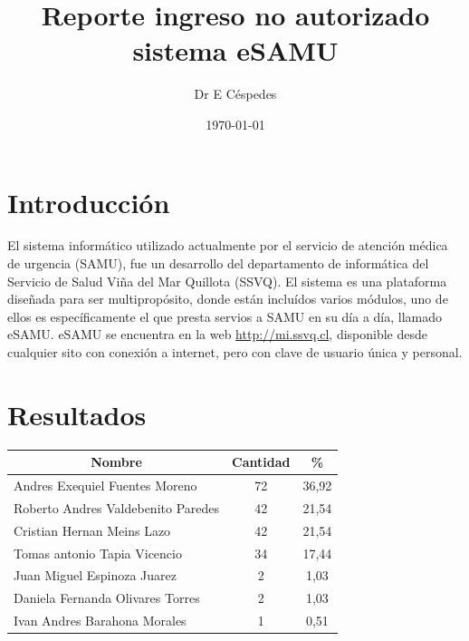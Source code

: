 \documentclass{article}
\title{Reporte ingreso no autorizado sistema eSAMU}
\author[1]{Dr E Céspedes}
\affil[1]{Tecnologías SAMU Viña del Mar}
\date{\today}
\begin{document}
\maketitle


\tableofcontents

\section{Introducción}
El sistema informático utilizado actualmente por el servicio de atención médica de urgencia (SAMU), fue un desarrollo del departamento de informática del Servicio de Salud Viña del Mar Quillota (SSVQ). El sistema es una plataforma diseñada para ser multipropósito, donde están incluídos varios módulos, uno de ellos es específicamente el que presta servios a SAMU en su día a día, llamado eSAMU. eSAMU se encuentra en la web  \url{http://mi.ssvq.cl}, disponible desde cualquier sito con conexión a internet, pero con clave de usuario única y personal.





\section{Resultados}


\begin{table}[h]
\begin{tabular}{@{}lcc@{}}
\toprule
\multicolumn{1}{c}{\textbf{Nombre}} & \multicolumn{1}{c}{\textbf{Cantidad}} & \multicolumn{1}{c}{\textbf{\%}} \\ \midrule
Andres Exequiel Fuentes Moreno      & 72                                    & 36,92                           \\
Roberto Andres Valdebenito Paredes  & 42                                    & 21,54                           \\
Cristian Hernan Meins Lazo          & 42                                    & 21,54                           \\
Tomas antonio Tapia Vicencio        & 34                                    & 17,44                           \\
Juan Miguel Espinoza Juarez         & 2                                     & 1,03                            \\
Daniela Fernanda Olivares Torres    & 2                                     & 1,03                            \\
Ivan Andres Barahona Morales        & 1                                     & 0,51                            \\ \bottomrule
\end{tabular}
\end{table}
\end{document}
